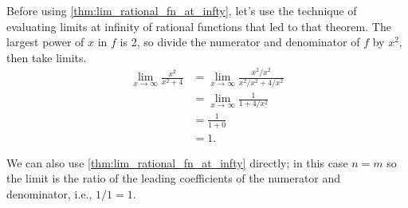 {Before using \autoref{thm:lim_rational_fn_at_infty}, let's use the technique of evaluating limits at infinity of rational functions that led to that theorem. The largest power of $x$ in $f$ is 2, so divide the numerator and denominator of $f$ by $x^2$, then take limits.
\begin{align*}
	\lim_{x\to\infty}\frac{x^2}{x^2+4}
	&= \lim_{x\to\infty}\frac{x^2/x^2}{x^2/x^2+4/x^2}\\
	&= \lim_{x\to\infty}\frac{1}{1+4/x^2}\\
	&= \frac1{1+0}\\
	&= 1.
\end{align*}

We can also use \autoref{thm:lim_rational_fn_at_infty} directly; in this case $n=m$ so the limit is the ratio of the leading coefficients of the numerator and denominator, i.e., $1/1=1$.}

